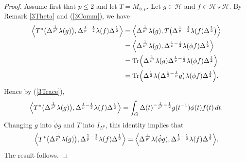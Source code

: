 \documentclass[12pt]{amsart}
\renewcommand{\H}{\mbox{${\mathcal H}$}}
\theoremstyle{remark}
\theoremstyle{definition}
\numberwithin{equation}{section}
\begin{document}
\begin{proof} 
Assume first that $p\leq 2$ and let $T=M_{\phi,p}$. Let $g\in\H$
and $f\in\H\star\H$. 
By Remark
\ref{3Theta} and  (\ref{3Comm}), we have
\begin{align*}
\Bigl\langle T^*\bigl(\Delta^{\frac{1}{p'}}\lambda(g)\bigr),
\Delta^{\frac{1}{p} -\frac12}\lambda(f)\Delta^{\frac12}\Bigr\rangle
& = \Bigl\langle \Delta^{\frac{1}{p'}}\lambda(g) , T\bigl(\Delta^{\frac{1}{p} -\frac12}\lambda(f)\Delta^{\frac12}\bigr)\Bigr\rangle\\
& = \Bigl\langle  \Delta^{\frac{1}{p'}}\lambda(g) ,\Delta^{\frac{1}{p} -\frac12}\lambda(\phi
f)\Delta^{\frac12}\Bigr\rangle\\
& = {\rm Tr}\Bigl(\Delta^{\frac{1}{p'}}\lambda(g) 
\Delta^{\frac{1}{p} -\frac12}\lambda(\phi
f)\Delta^{\frac12}\Bigr)\\
& =  {\rm Tr}\Bigl(\Delta^{\frac{1}{2}}\lambda
\bigl(\Delta^{\frac12-\frac{1}{p}} g\bigr)
\lambda(\phi
f)\Delta^{\frac12}\Bigr).
\end{align*}
Hence by (\ref{3Trace}),
$$
\Bigl\langle T^*\bigl(\Delta^{\frac{1}{p'}}\lambda(g)\bigr),
\Delta^{\frac{1}{p} -\frac12}\lambda(f)\Delta^{\frac12}\Bigr\rangle 
= \int_G\Delta(t)^{-\frac{1}{p'}-\frac12}g(t^{-1})\phi(t) f(t)\, dt.
$$
Changing $g$ into $\check{\phi} g$ and $T$ into $I_{L^p}$, this identity implies that
$$
\Bigl\langle T^*\bigl(\Delta^{\frac{1}{p'}}\lambda(g)\bigr),
\Delta^{\frac{1}{p} -\frac12}\lambda(f)\Delta^{\frac12}\Bigr\rangle 
=\Bigl\langle\Delta^{\frac{1}{p'}}\lambda(\check{\phi} g),
\Delta^{\frac{1}{p} -\frac12}\lambda(f)\Delta^{\frac12}\Bigr\rangle.
$$
The result follows.



\end{proof}
\end{document}
